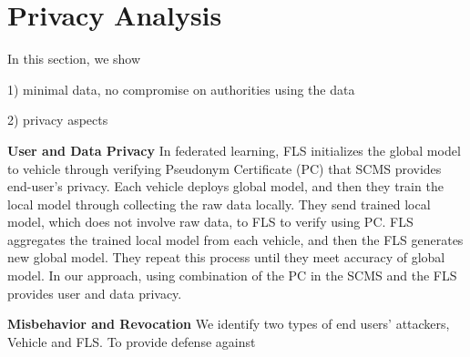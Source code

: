 \section{Privacy Analysis}
\label{pan}
In this section, we show   

1) minimal data, no compromise on authorities using the data

2) privacy aspects

\textbf{User and Data Privacy}
In federated learning, FLS initializes the global model to vehicle through verifying Pseudonym Certificate (PC) that SCMS provides end-user's privacy. Each vehicle deploys global model, and then they train the local model through collecting the raw data locally. They send trained local model, which does not involve raw data, to FLS to verify using PC. FLS aggregates the trained local model from each vehicle, and then the FLS generates new global model. They repeat this process until they meet accuracy of global model. In our approach, using combination of the PC in the SCMS and the FLS provides user and data privacy.  


\textbf{Misbehavior and Revocation}
We identify two types of end users' attackers, Vehicle and FLS. To provide defense against 